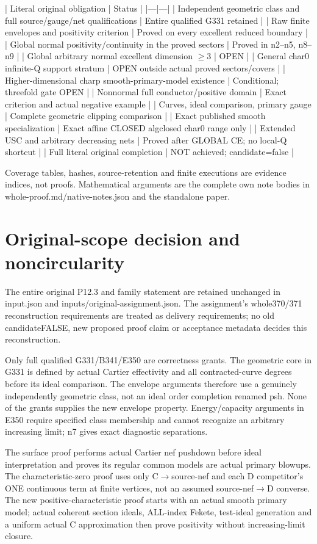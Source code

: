 \documentclass[11pt]{article}
\begin{document}
| Literal original obligation | Status | |---|---| | Independent geometric class and full source/gauge/net qualifications | Entire qualified G331 retained | | Raw finite envelopes and positivity criterion | Proved on every excellent reduced boundary | | Global normal positivity/continuity in the proved sectors | Proved in n2--n5, n8--n9 | | Global arbitrary normal excellent dimension \ensuremath{\geq}3 | OPEN | | General char0 infinite-Q support stratum | OPEN outside actual proved sectors/covers | | Higher-dimensional charp smooth-primary-model existence | Conditional; threefold gate OPEN | | Nonnormal full conductor/positive domain | Exact criterion and actual negative example | | Curves, ideal comparison, primary gauge | Complete geometric clipping comparison | | Exact published smooth specialization | Exact affine CLOSED algclosed char0 range only | | Extended USC and arbitrary decreasing nets | Proved after GLOBAL CE; no local-Q shortcut | | Full literal original completion | NOT achieved; candidate=false |

Coverage tables, hashes, source-retention and finite executions are evidence indices, not proofs. Mathematical arguments are the complete own note bodies in whole-proof.md/native-notes.json and the standalone paper. 

\section{Original-scope decision and noncircularity}

The entire original P12.3 and family statement are retained unchanged in input.json and inputs/original-assignment.json. The assignment's whole370/371 reconstruction requirements are treated as delivery requirements; no old candidateFALSE, new proposed proof claim or acceptance metadata decides this reconstruction.

Only full qualified G331/B341/E350 are correctness grants. The geometric core in G331 is defined by actual Cartier effectivity and all contracted-curve degrees before its ideal comparison. The envelope arguments therefore use a genuinely independently geometric class, not an ideal order completion renamed psh. None of the grants supplies the new envelope property. Energy/capacity arguments in E350 require specified class membership and cannot recognize an arbitrary increasing limit; n7 gives exact diagnostic separations.

The surface proof performs actual Cartier nef pushdown before ideal interpretation and proves its regular common models are actual primary blowups. The characteristic-zero proof uses only C\ensuremath{\to}source-nef and each D competitor's ONE continuous term at finite vertices, not an assumed source-nef\ensuremath{\to}D converse. The new positive-characteristic proof starts with an actual smooth primary model; actual coherent section ideals, ALL-index Fekete, test-ideal generation and a uniform actual C approximation then prove positivity without increasing-limit closure.
\end{document}
